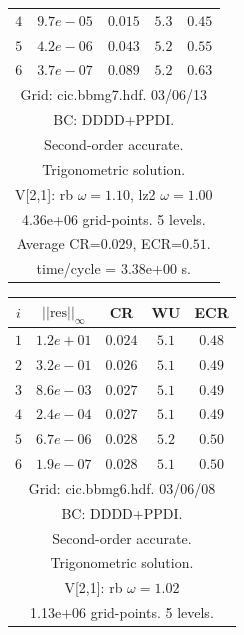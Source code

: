 \begin{table}[hbt]
\begin{center}
{\begin{tabular}{|c|c|c|c|c|}
 $ 4$  & $ 9.7e-05$ & $0.015$ & $ 5.3$ & $0.45$ \\ 
 $ 5$  & $ 4.2e-06$ & $0.043$ & $ 5.2$ & $0.55$ \\ 
 $ 6$  & $ 3.7e-07$ & $0.089$ & $ 5.2$ & $0.63$ \\ 
\hline 
\multicolumn{5}{|c|}{Grid: cic.bbmg7.hdf. 03/06/13}  \\
\multicolumn{5}{|c|}{BC: DDDD+PPDI.}  \\
\multicolumn{5}{|c|}{Second-order accurate.}  \\
\multicolumn{5}{|c|}{Trigonometric solution.}  \\
\multicolumn{5}{|c|}{V[2,1]: rb $\omega=1.10$, lz2 $\omega=1.00$}  \\
\multicolumn{5}{|c|}{4.36e+06 grid-points. 5 levels.}  \\
\multicolumn{5}{|c|}{Average CR=$0.029$, ECR=$0.51$.}  \\
\multicolumn{5}{|c|}{time/cycle = 3.38e+00 s.}  \\
\hline 
\end{tabular}
\begin{tabular}{|c|c|c|c|c|} \hline 
 $i$   & $\vert\vert\mbox{res}\vert\vert_\infty$  &  CR     &  WU    & ECR  \\   \hline 
 $ 1$  & $ 1.2e+01$ & $0.024$ & $ 5.1$ & $0.48$ \\ 
 $ 2$  & $ 3.2e-01$ & $0.026$ & $ 5.1$ & $0.49$ \\ 
 $ 3$  & $ 8.6e-03$ & $0.027$ & $ 5.1$ & $0.49$ \\ 
 $ 4$  & $ 2.4e-04$ & $0.027$ & $ 5.1$ & $0.49$ \\ 
 $ 5$  & $ 6.7e-06$ & $0.028$ & $ 5.2$ & $0.50$ \\ 
 $ 6$  & $ 1.9e-07$ & $0.028$ & $ 5.1$ & $0.50$ \\ 
\hline 
\multicolumn{5}{|c|}{Grid: cic.bbmg6.hdf. 03/06/08}  \\
\multicolumn{5}{|c|}{BC: DDDD+PPDI.}  \\
\multicolumn{5}{|c|}{Second-order accurate.}  \\
\multicolumn{5}{|c|}{Trigonometric solution.}  \\
\multicolumn{5}{|c|}{V[2,1]: rb $\omega=1.02$}  \\
\multicolumn{5}{|c|}{1.13e+06 grid-points. 5 levels.}  \\

\end{tabular}}
\end{center}
\end{table}

